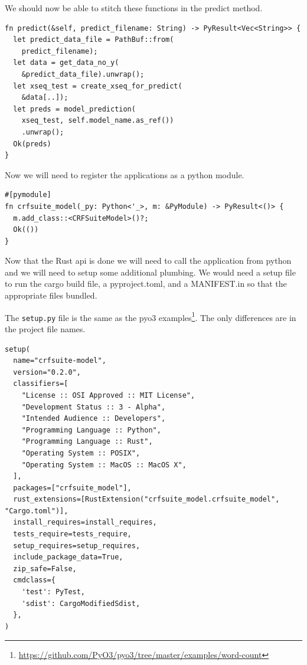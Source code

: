 \documentclass{book}
\begin{document}
We should now be able to stitch these functions in the predict method.

\begin{lstlisting}[caption={chapter8/crfsuite-model/src/lib.rs}, basicstyle=\small]
fn predict(&self, predict_filename: String) -> PyResult<Vec<String>> {
  let predict_data_file = PathBuf::from(
  	predict_filename);
  let data = get_data_no_y(
  	&predict_data_file).unwrap();
  let xseq_test = create_xseq_for_predict(
  	&data[..]);
  let preds = model_prediction(
  	xseq_test, self.model_name.as_ref())
	.unwrap();
  Ok(preds)
}
\end{lstlisting}

Now we will need to register the applications as a python module.

\begin{lstlisting}[caption={chapter8/crfsuite-model/src/lib.rs}, basicstyle=\small]
#[pymodule]
fn crfsuite_model(_py: Python<'_>, m: &PyModule) -> PyResult<()> {
  m.add_class::<CRFSuiteModel>()?;
  Ok(())
}
\end{lstlisting}

Now that the Rust api is done we will need to call the application from python and we will need to setup some additional plumbing. We would need a setup file to run the cargo build file, a pyproject.toml, and a MANIFEST.in so that the appropriate files bundled.

The \lstinline{setup.py} file is the same as the pyo3 examples\footnote{\href{}{https://github.com/PyO3/pyo3/tree/master/examples/word-count}}. The only differences are in the project file names.

\begin{lstlisting}[caption={chapter8/crfsuite\\-model/setup.py}, basicstyle=\small]
setup(
  name="crfsuite-model",
  version="0.2.0",
  classifiers=[
    "License :: OSI Approved :: MIT License",
    "Development Status :: 3 - Alpha",
    "Intended Audience :: Developers",
    "Programming Language :: Python",
    "Programming Language :: Rust",
    "Operating System :: POSIX",
    "Operating System :: MacOS :: MacOS X",
  ],
  packages=["crfsuite_model"],
  rust_extensions=[RustExtension("crfsuite_model.crfsuite_model", "Cargo.toml")],
  install_requires=install_requires,
  tests_require=tests_require,
  setup_requires=setup_requires,
  include_package_data=True,
  zip_safe=False,
  cmdclass={
    'test': PyTest,
    'sdist': CargoModifiedSdist,
  },
)
\end{lstlisting}
\end{document}
